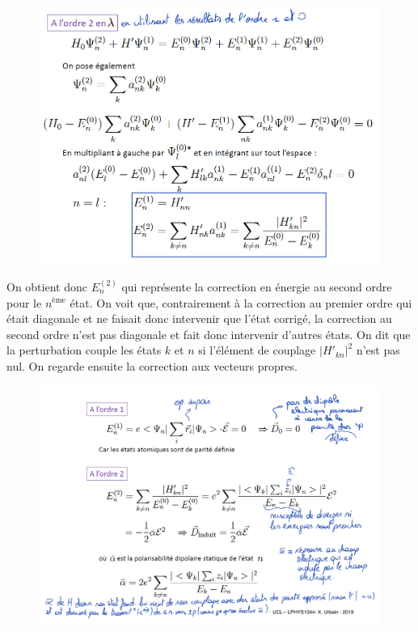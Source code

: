 \begin{figure}[H]
    \centering
    \includegraphics[scale=0.65]{Images2/ordre2.1.PNG}
\end{figure}
On obtient donc $E_n^{(2)}$ qui représente la correction en énergie au second ordre pour le $n^\text{ème}$ état. On voit que, contrairement à la correction au premier ordre qui était diagonale et ne faisait donc intervenir que l'état corrigé, la correction au second ordre n'est pas diagonale et fait donc intervenir d'autres états. On dit que la perturbation couple les états $k$ et $n$ si l'élément de couplage $|H'_{kn}|^2$ n'est pas nul. On regarde ensuite la correction aux vecteurs propres.
\begin{figure}[H]
    \centering
    \includegraphics[scale=0.65]{Images2/ordre2.2.PNG}
\end{figure}

